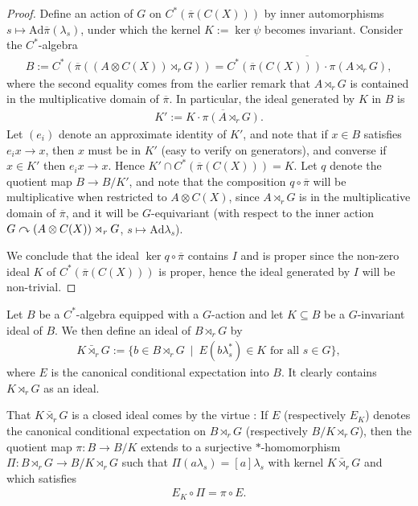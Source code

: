 \begin{proof}
	Define an action of $G$ on $C^*(\overline \pi(C(X)))$ by inner automorphisms $s \mapsto \mathrm{Ad} \overline \pi(\lambda_s)$, under which the kernel $K := \ker \psi$ becomes invariant. Consider the $C^*$-algebra 
	\begin{align*}
		B := C^*(\overline \pi ( ( A \otimes C(X)) \rtimes_r G)) = \overline{ C^*(\overline \pi(C(X))) \cdot \pi(A \rtimes_r G)},
	\end{align*}
	where the second equality comes from the earlier remark that $A \rtimes_r G$ is contained in the multiplicative domain of $\overline \pi$. In particular, the ideal generated by $K$ in $B$ is
	\begin{align*}
		K' :=\overline{K \cdot \pi(A \rtimes_r G)}.
	\end{align*}
	Let $(e_i)$ denote an approximate identity of $K'$, and note that if $x \in B$ satisfies $e_i x \to x$, then $x$ must be in $K'$ (easy to verify on generators), and converse if $x \in K'$ then $e_i x \to x$. Hence $K' \cap C^*(\overline \pi(C(X))) = K$. Let $q$ denote the quotient map $B \to B/K'$, and note that the composition $q \circ \overline \pi$ will be multiplicative when restricted to $A \otimes C(X)$, since $A \rtimes_r G$ is in the multiplicative domain of $\overline \pi$, and it will be $G$-equivariant (with respect to the inner action $G \stackrel{}{\curvearrowright} (A \otimes C(X))\rtimes_r G$, $s \mapsto \mathrm{Ad} \lambda_s$). 

	We conclude that the ideal $\ker q \circ \overline \pi$ contains $I$ and is proper since the non-zero ideal $K$ of $C^*(\overline \pi(C(X)))$ is proper, hence the ideal generated by $I$ will be non-trivial.
\end{proof}
\begin{definition}
	Let $B$ be a $C^*$-algebra equipped with a $G$-action and let $K \subseteq B$ be a $G$-invariant ideal of $B$. We then define an ideal  of $B \rtimes_r G$ by
	\begin{align*}
		K \bar \rtimes_r G := \{b \in B \rtimes_r G \ \mid \ E(b \lambda_s^* ) \in K \text{ for all } s \in G\},
	\end{align*}
	where $E$ is the canonical conditional expectation into $B$. It clearly contains $K \rtimes_r G$ as an ideal.
\end{definition}
\begin{remark}
	That $K \bar \rtimes_r G$ is a closed ideal comes by the virtue \cite[lemma 3.2]{hamana1979injective}: If $E$ (respectively $E_K$) denotes the canonical conditional expectation on $B \rtimes_r G$ (respectively $B/K \rtimes_r G$), then the quotient map $\pi \colon B \to B/K$ extends to a surjective $*$-homomorphism $\Pi \colon B \rtimes_r G \to B/K \rtimes_r G$ such that $\Pi(a \lambda_s) = [a] \lambda_s$ with kernel $K \bar \rtimes_r G$ and which satisfies
	\begin{align*}
		E_K \circ \Pi =  \pi \circ E.
	\end{align*}
	\label{condidealrem}
\end{remark}
